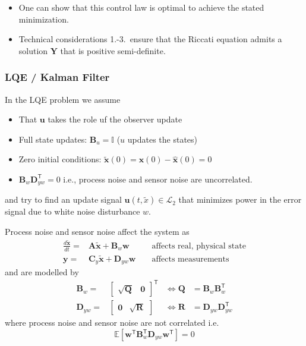 \begin{itemize}
    \item One can show that this control law is optimal to achieve the stated minimization.
    \item Technical considerations 1.-3.\ ensure that the Riccati equation admits a solution $\mathbf{Y}$ that is positive semi-definite.
\end{itemize}

\subsubsection{LQE / Kalman Filter}

\newpar{}

In the LQE problem we assume
\begin{itemize}
    \item That $\mathbf{u}$ takes the role uf the observer update
    \item Full state updates: $\mathbf{B}_u=\mathbf{\mathbb{I}}$ ($u$ updates the states)
    \item Zero initial conditions: $\tilde{\mathbf{x}}(0)=\mathbf{x}(0)-\hat{\mathbf{x}}(0)=0$
    \item $\mathbf{B}_w \mathbf{D}_{yw}^{\mathsf{T}}=0$ i.e., process noise and sensor noise are uncorrelated.
\end{itemize}
and try to find an update signal $\mathbf{u}(t,\tilde{x})\in \mathcal{L}_2$ that minimizes power in the error signal due to white noise disturbance $w$.

\newpar{}

Process noise and sensor noise affect the system as
\begin{align*}
    \frac{d\tilde{\mathbf{x}} }{dt}= & \mathbf{A}\tilde{\mathbf{x}}+\mathbf{B}_{w} \mathbf{w}   &  & \text{ affects real, physical state} \\
    \mathbf{y}=                      & \mathbf{C}_y\tilde{\mathbf{x}}+\mathbf{D}_{yw}\mathbf{w} &  & \text{ affects measurements}
\end{align*}
and are modelled by
\begin{align*}
    \mathbf{B}_w=    & \begin{bmatrix}\sqrt{\mathbf{Q}}&\mathbf{0}\end{bmatrix}^{\mathsf{T}} & \Leftrightarrow \mathbf{Q}          & = \mathbf{B}_w\mathbf{B}_w^{\mathsf{T}}       \\
    \mathbf{D}_{yw}= & \begin{bmatrix}\mathbf{0}&\sqrt{\mathbf{R}}\end{bmatrix}              & \Leftrightarrow \mathbf{\mathbf{R}} & = \mathbf{D}_{yw}\mathbf{D}_{yw}^{\mathsf{T}}
\end{align*}
where process noise and sensor noise are not correlated i.e.
\begin{equation*}
    \mathbb{E}\left[\mathbf{w}^{\mathsf{T}} \mathbf{B}_w^{\mathsf{T}} \mathbf{D}_{yw}\mathbf{w}^{\mathsf{T}}\right]=0
\end{equation*}

